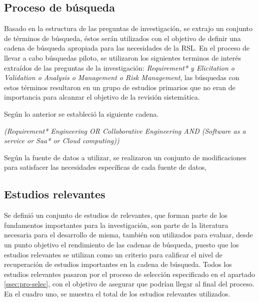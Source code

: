 \documentclass[conference,onecolumn,10pt]{IEEEtran}
\begin{document}
\subsection{Proceso de búsqueda}
Basado en la estructura de las preguntas de investigación, se extrajo un conjunto de 
términos de búsqueda, éstos serán utilizados con el objetivo de definir una cadena de búsqueda apropiada para 
las necesidades de la RSL. 
En el proceso de llevar a cabo búsquedas piloto, se utilizaron los siguientes terminos de interés extraídos de las preguntas de la investigación: 
\emph{Requirement* y Elicitation o Validation o Analysis o Management o Risk Management}, las búsquedas con estos 
términos resultaron en un grupo de estudios primarios que no eran de importancia para alcanzar el objetivo de la 
revisión sistemática. 

Según lo anterior se estableció la siguiente cadena.

\emph{(Requirement* Engineering OR Collaborative Engineering AND (Software as a service or Saa* or Cloud computing))}

Según la fuente de datos a utilizar, se realizaron un conjunto de modificaciones para satisfacer las necesidades específicas de cada fuente de datos,

\subsection{Estudios relevantes}
Se definió un conjunto de estudios de relevantes, que forman parte de los fundamentos importantes para la investigación, son parte de la literatura 
necesaria para el desarrollo de misma, también son utilizados para evaluar, desde un punto objetivo el rendimiento de las cadenas de búsqueda, 
puesto que los estudios relevantes se utilizan como un criterio para calificar el nivel de recuperación de estudios importantes en la cadena de búsqueda.
Todos los estudios relevantes pasaron por el proceso de selección especificado en el apartado \ref{ssec:pro-selec}, con el objetivo de asegurar 
que podrían llegar al final del proceso. 
En el cuadro uno, se muestra el total de los estudios relevantes utilizados.
\end{document}

